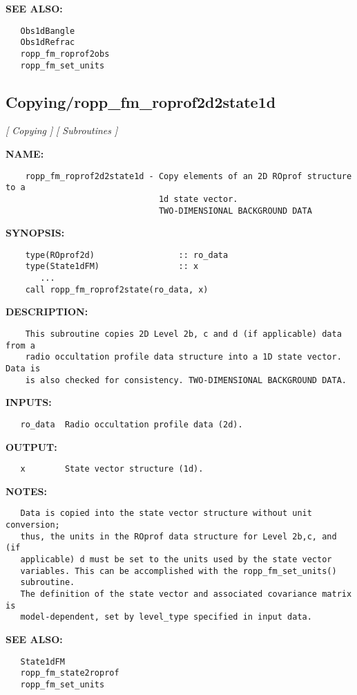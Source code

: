 \textbf{SEE ALSO:}\hspace{0.08in}\begin{Verbatim}
   Obs1dBangle
   Obs1dRefrac
   ropp_fm_roprof2obs
   ropp_fm_set_units
\end{Verbatim}
\subsection{Copying/ropp\_fm\_roprof2d2state1d}
\textsl{[ Copying ]}
\textsl{[ Subroutines ]}

\label{ch:robo29}
\label{ch:Copying_ropp_fm_roprof2d2state1d}
\textbf{NAME:}\hspace{0.08in}\begin{Verbatim}
    ropp_fm_roprof2d2state1d - Copy elements of an 2D ROprof structure to a 
                               1d state vector.  
                               TWO-DIMENSIONAL BACKGROUND DATA
\end{Verbatim}
\textbf{SYNOPSIS:}\hspace{0.08in}\begin{Verbatim}
    type(ROprof2d)                 :: ro_data
    type(State1dFM)                :: x
       ...
    call ropp_fm_roprof2state(ro_data, x)
\end{Verbatim}
\textbf{DESCRIPTION:}\hspace{0.08in}\begin{Verbatim}
    This subroutine copies 2D Level 2b, c and d (if applicable) data from a
    radio occultation profile data structure into a 1D state vector. Data is
    is also checked for consistency. TWO-DIMENSIONAL BACKGROUND DATA.
\end{Verbatim}
\textbf{INPUTS:}\hspace{0.08in}\begin{Verbatim}
   ro_data  Radio occultation profile data (2d).
\end{Verbatim}
\textbf{OUTPUT:}\hspace{0.08in}\begin{Verbatim}
   x        State vector structure (1d).
\end{Verbatim}
\textbf{NOTES:}\hspace{0.08in}\begin{Verbatim}
   Data is copied into the state vector structure without unit conversion;
   thus, the units in the ROprof data structure for Level 2b,c, and (if
   applicable) d must be set to the units used by the state vector 
   variables. This can be accomplished with the ropp_fm_set_units()
   subroutine.
   The definition of the state vector and associated covariance matrix is 
   model-dependent, set by level_type specified in input data.
\end{Verbatim}
\textbf{SEE ALSO:}\hspace{0.08in}\begin{Verbatim}
   State1dFM
   ropp_fm_state2roprof
   ropp_fm_set_units
\end{Verbatim}
